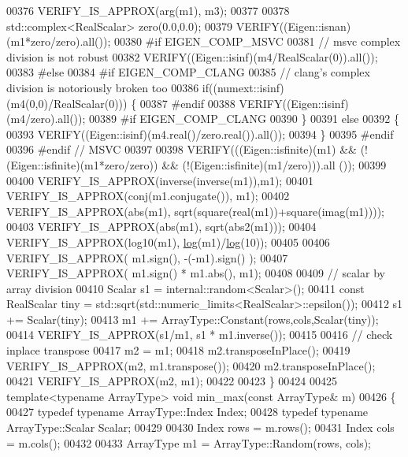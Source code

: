 \begin{DoxyCode}
00376   VERIFY\_IS\_APPROX(arg(m1), m3);
00377 
00378   std::complex<RealScalar> zero(0.0,0.0);
00379   VERIFY((Eigen::isnan)(m1*zero/zero).all());
00380 \textcolor{preprocessor}{#if EIGEN\_COMP\_MSVC}
00381   \textcolor{comment}{// msvc complex division is not robust}
00382   VERIFY((Eigen::isinf)(m4/RealScalar(0)).all());
00383 \textcolor{preprocessor}{#else}
00384 \textcolor{preprocessor}{#if EIGEN\_COMP\_CLANG}
00385   \textcolor{comment}{// clang's complex division is notoriously broken too}
00386   \textcolor{keywordflow}{if}((numext::isinf)(m4(0,0)/RealScalar(0))) \{
00387 \textcolor{preprocessor}{#endif}
00388     VERIFY((Eigen::isinf)(m4/zero).all());
00389 \textcolor{preprocessor}{#if EIGEN\_COMP\_CLANG}
00390   \}
00391   \textcolor{keywordflow}{else}
00392   \{
00393     VERIFY((Eigen::isinf)(m4.real()/zero.real()).all());
00394   \}
00395 \textcolor{preprocessor}{#endif}
00396 \textcolor{preprocessor}{#endif // MSVC}
00397 
00398   VERIFY(((Eigen::isfinite)(m1) && (!(Eigen::isfinite)(m1*zero/zero)) && (!(Eigen::isfinite)(m1/zero))).all
      ());
00399 
00400   VERIFY\_IS\_APPROX(inverse(inverse(m1)),m1);
00401   VERIFY\_IS\_APPROX(conj(m1.conjugate()), m1);
00402   VERIFY\_IS\_APPROX(abs(m1), sqrt(square(real(m1))+square(imag(m1))));
00403   VERIFY\_IS\_APPROX(abs(m1), sqrt(abs2(m1)));
00404   VERIFY\_IS\_APPROX(log10(m1), \hyperlink{structlog}{log}(m1)/\hyperlink{structlog}{log}(10));
00405 
00406   VERIFY\_IS\_APPROX( m1.sign(), -(-m1).sign() );
00407   VERIFY\_IS\_APPROX( m1.sign() * m1.abs(), m1);
00408 
00409   \textcolor{comment}{// scalar by array division}
00410   Scalar  s1 = internal::random<Scalar>();
00411   \textcolor{keyword}{const} RealScalar tiny = std::sqrt(std::numeric\_limits<RealScalar>::epsilon());
00412   s1 += Scalar(tiny);
00413   m1 += ArrayType::Constant(rows,cols,Scalar(tiny));
00414   VERIFY\_IS\_APPROX(s1/m1, s1 * m1.inverse());
00415 
00416   \textcolor{comment}{// check inplace transpose}
00417   m2 = m1;
00418   m2.transposeInPlace();
00419   VERIFY\_IS\_APPROX(m2, m1.transpose());
00420   m2.transposeInPlace();
00421   VERIFY\_IS\_APPROX(m2, m1);
00422 
00423 \}
00424 
00425 \textcolor{keyword}{template}<\textcolor{keyword}{typename} ArrayType> \textcolor{keywordtype}{void} min\_max(\textcolor{keyword}{const} ArrayType& m)
00426 \{
00427   \textcolor{keyword}{typedef} \textcolor{keyword}{typename} ArrayType::Index Index;
00428   \textcolor{keyword}{typedef} \textcolor{keyword}{typename} ArrayType::Scalar Scalar;
00429 
00430   Index rows = m.rows();
00431   Index cols = m.cols();
00432 
00433   ArrayType m1 = ArrayType::Random(rows, cols);

\end{DoxyCode}
